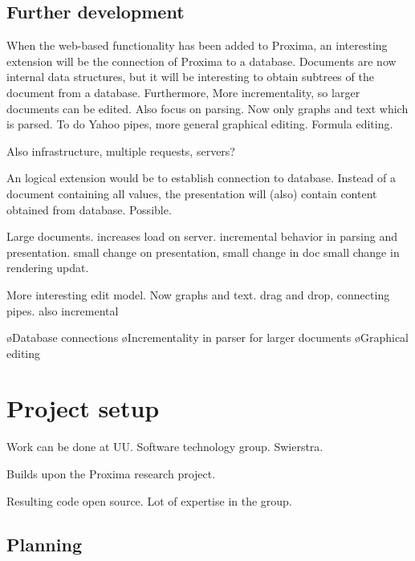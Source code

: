 




\subsection{Further development}


When the web-based functionality has been added to Proxima, an interesting extension will be the connection of Proxima to a database. Documents are now internal data structures, but it will be interesting to obtain subtrees of the document from a database. Furthermore, More incrementality, so larger documents can be edited. Also focus on parsing. Now only graphs and text which is parsed. To do Yahoo pipes, more general graphical editing. Formula editing.

Also infrastructure, multiple requests, servers? 


An logical extension would be to establish connection to database. Instead of a document containing all values, the presentation will (also) contain content obtained from database. Possible.

Large documents. increases load on server. incremental behavior in parsing and presentation. small change on presentation, small change in doc small change in rendering updat.

More interesting edit model. Now graphs and text. drag and drop, connecting pipes. also incremental

\bl
\o Database connections
\o Incrementality in parser for larger documents
\o Graphical editing
\el

\section{Project setup}

Work can be done at UU. Software technology group. Swierstra.

Builds upon the Proxima research project.

Resulting code open source. Lot of expertise in the group.

\subsection{Planning}

